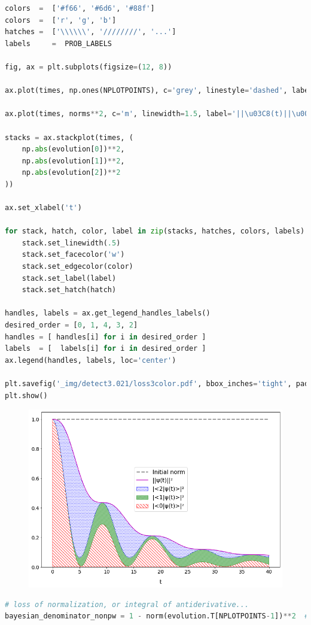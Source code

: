 \begin{lstlisting}[language=Python]
colors  =  ['#f66', '#6d6', '#88f']
colors  =  ['r', 'g', 'b']
hatches =  ['\\\\\\', '////////', '...']
labels     =  PROB_LABELS

fig, ax = plt.subplots(figsize=(12, 8))

ax.plot(times, np.ones(NPLOTPOINTS), c='grey', linestyle='dashed', label='Initial norm', linewidth=2.5)

ax.plot(times, norms**2, c='m', linewidth=1.5, label='||\u03C8(t)||\u00B2')

stacks = ax.stackplot(times, (
    np.abs(evolution[0])**2,
    np.abs(evolution[1])**2,
    np.abs(evolution[2])**2
))

ax.set_xlabel('t')

for stack, hatch, color, label in zip(stacks, hatches, colors, labels):
    stack.set_linewidth(.5)
    stack.set_facecolor('w')
    stack.set_edgecolor(color)
    stack.set_label(label)
    stack.set_hatch(hatch)
    
handles, labels = ax.get_legend_handles_labels()
desired_order = [0, 1, 4, 3, 2]
handles = [ handles[i] for i in desired_order ]
labels  = [  labels[i] for i in desired_order ]
ax.legend(handles, labels, loc='center')

plt.savefig('_img/detect3.021/loss3color.pdf', bbox_inches='tight', pad_inches=0)
plt.show()
\end{lstlisting}

\begin{figure}[h!]
\centering
\includegraphics[width=0.66\linewidth]{tex/appendix/nb/jupyter/3lev/output_37_0.png}

\end{figure}

\begin{lstlisting}[language=Python]
# loss of normalization, or integral of antiderivative...
bayesian_denominator_nonpw = 1 - norm(evolution.T[NPLOTPOINTS-1])**2  # TODO! explain/replace
\end{lstlisting}

